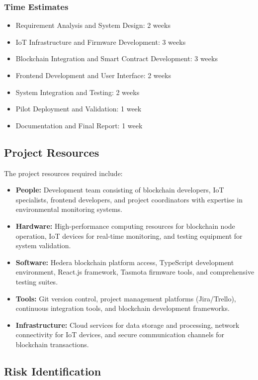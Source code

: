 \documentclass[oneside,a4paper,12pt]{book}
\begin{document}
\subsubsection{Time Estimates}
\begin{itemize}
\item Requirement Analysis and System Design: 2 weeks
\item IoT Infrastructure and Firmware Development: 3 weeks  
\item Blockchain Integration and Smart Contract Development: 3 weeks
\item Frontend Development and User Interface: 2 weeks
\item System Integration and Testing: 2 weeks
\item Pilot Deployment and Validation: 1 week
\item Documentation and Final Report: 1 week
\end{itemize}

\subsection{Project Resources}
The project resources required include:

\begin{itemize}
    \item \textbf{People:} Development team consisting of blockchain developers, IoT specialists, frontend developers, and project coordinators with expertise in environmental monitoring systems.
    \item \textbf{Hardware:} High-performance computing resources for blockchain node operation, IoT devices for real-time monitoring, and testing equipment for system validation.
    \item \textbf{Software:} Hedera blockchain platform access, TypeScript development environment, React.js framework, Tasmota firmware tools, and comprehensive testing suites.
    \item \textbf{Tools:} Git version control, project management platforms (Jira/Trello), continuous integration tools, and blockchain development frameworks.
    \item \textbf{Infrastructure:} Cloud services for data storage and processing, network connectivity for IoT devices, and secure communication channels for blockchain transactions.
\end{itemize}

\subsection{Risk Identification}
\end{document}
